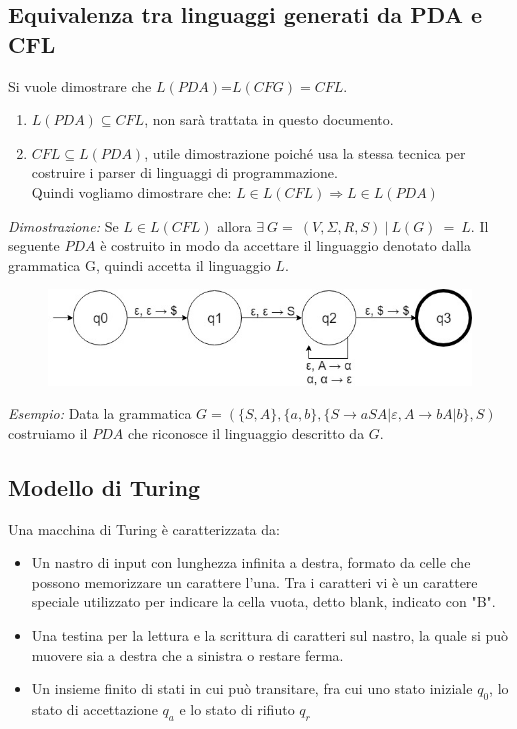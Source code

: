 \subsection{Equivalenza tra linguaggi generati da PDA e CFL}
Si vuole dimostrare che $L(PDA) \textbf{=} L(CFG) = CFL$. 
\begin{enumerate}
	\item $L(PDA) \subseteq CFL$, non sar\`a trattata in questo documento.
	\item $CFL \subseteq L(PDA)$, utile dimostrazione poich\'e usa la stessa tecnica per costruire i parser di linguaggi di programmazione. \\
		Quindi vogliamo dimostrare che: $L \in L(CFL) \Rightarrow L \in L(PDA)$
\end{enumerate} 
\textit{Dimostrazione:}
Se $L \in L(CFL)$ allora $\exists \ G = \ (V,\Sigma,R,S) \ | \ L(G) \ = \ L $. Il seguente $PDA$ è costruito in modo da accettare il linguaggio denotato dalla grammatica G, quindi accetta il linguaggio $L$.
\begin{figure}[H]
	\includegraphics[scale=0.5]{pda3}
\end{figure}
\begin{description}
	\item \textit{Esempio:} Data la grammatica $G = (\{S,A\}, \{a, b\}, \{S \to aSA | \varepsilon, A \to bA | b\}, S )$ costruiamo il $PDA$ che riconosce il linguaggio descritto da $G$. \\
\end{description}

\newpage 

\subsection{Modello di Turing}
Una macchina di Turing è caratterizzata da:
\begin{itemize}
	\item Un nastro di input con lunghezza infinita a destra, formato da celle che possono memorizzare un carattere l'una. Tra i caratteri vi è un carattere speciale utilizzato per indicare la cella vuota, detto blank, indicato con "B".
	\item Una testina per la lettura e la scrittura di caratteri sul nastro, la quale si pu\`o muovere sia a destra che a sinistra o restare ferma.
	\item Un insieme finito di stati in cui pu\`o transitare, fra cui uno stato iniziale $q_0$, lo stato di accettazione $q_a$ e lo stato di rifiuto $q_r$
\end{itemize}
